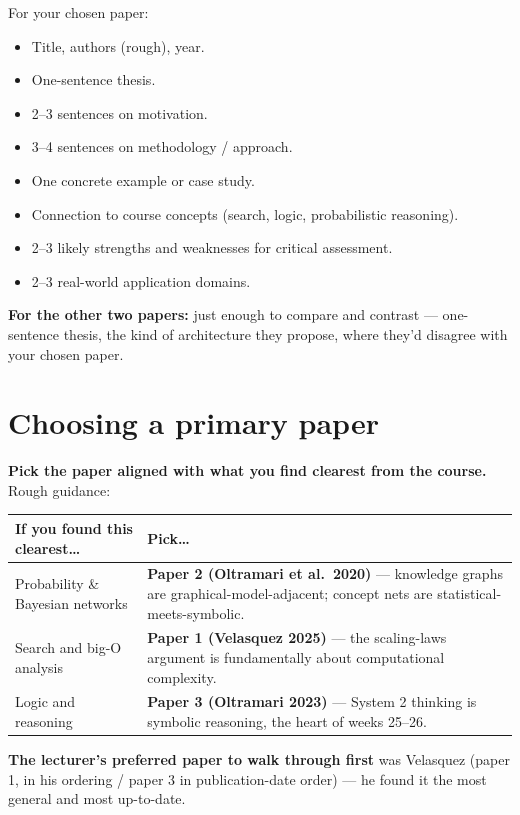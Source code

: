 \documentclass[11pt, a4paper]{article}
\newcommand{\thead}[1]{\textbf{#1}}
\begin{document}
For your chosen paper:
\begin{itemize}
  \item Title, authors (rough), year.
  \item One-sentence thesis.
  \item 2--3 sentences on motivation.
  \item 3--4 sentences on methodology / approach.
  \item One concrete example or case study.
  \item Connection to course concepts (search, logic, probabilistic reasoning).
  \item 2--3 likely strengths and weaknesses for critical assessment.
  \item 2--3 real-world application domains.
\end{itemize}

\textbf{For the other two papers:} just enough to compare and contrast — one-sentence thesis, the kind of architecture they propose, where they'd disagree with your chosen paper.

\section{Choosing a primary paper}

\textbf{Pick the paper aligned with what you find clearest from the course.} Rough guidance:

\begin{center}
\begin{tabular}{@{}p{4.5cm}p{9.5cm}@{}}
\toprule
\thead{If you found this clearest\dots} & \thead{Pick\dots} \\
\midrule
Probability \& Bayesian networks  & \textbf{Paper 2 (Oltramari et al.\ 2020)} — knowledge graphs are graphical-model-adjacent; concept nets are statistical-meets-symbolic. \\
Search and big-O analysis         & \textbf{Paper 1 (Velasquez 2025)} — the scaling-laws argument is fundamentally about computational complexity. \\
Logic and reasoning               & \textbf{Paper 3 (Oltramari 2023)} — System 2 thinking is symbolic reasoning, the heart of weeks 25--26. \\
\bottomrule
\end{tabular}
\end{center}

\textbf{The lecturer's preferred paper to walk through first} was Velasquez (paper 1, in his ordering / paper 3 in publication-date order) — he found it the most general and most up-to-date.
\end{document}
